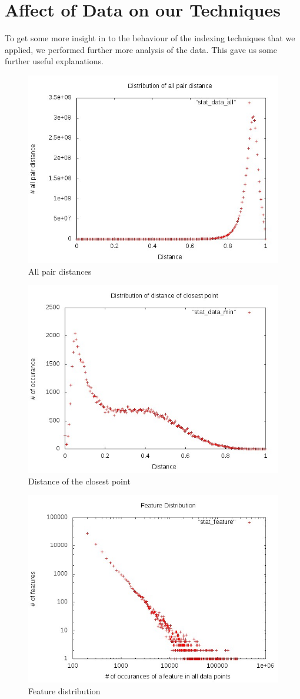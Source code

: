 \section{Affect of Data on our Techniques}
To get some more insight in to the behaviour of the indexing techniques that we applied, we performed further more analysis of the data. This gave us some further useful explanations.\\

\begin{figure}[ht!]	
\centering
\includegraphics[width=0.35 \columnwidth]{img/all.jpg}
\caption{All pair distances}
\end{figure}
\begin{figure}[ht!]	
\centering
\includegraphics[width=0.35 \columnwidth]{img/min.jpg}
\caption{Distance of the closest point}
\end{figure}

\begin{figure}[ht!]	
\centering
\includegraphics[width=0.35 \columnwidth]{img/feature.jpg}
\caption{Feature distribution}
\end{figure}

